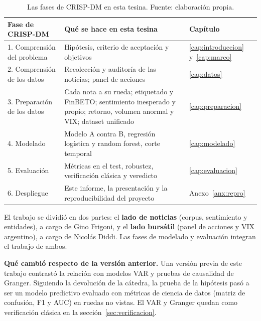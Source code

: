 \begin{table}[H]
\centering\small
\begin{tabularx}{\linewidth}{@{}L{3.6cm}YL{1.9cm}@{}}
\toprule
\textbf{Fase de CRISP-DM} & \textbf{Qué se hace en esta tesina} & \textbf{Capítulo} \\
. Comprensión del problema & Hipótesis, criterio de aceptación y objetivos & \ref{cap:introduccion} y~\ref{cap:marco} \\
2. Comprensión de los datos & Recolección y auditoría de las noticias; panel de acciones & \ref{cap:datos} \\
3. Preparación de los datos & Cada nota a su rueda; etiquetado y FinBETO; sentimiento inesperado y propio; retorno, volumen anormal y VIX; dataset unificado & \ref{cap:preparacion} \\
4. Modelado & Modelo A contra B, regresión logística y random forest, corte temporal & \ref{cap:modelado} \\
5. Evaluación & Métricas en el test, robustez, verificación clásica y veredicto & \ref{cap:evaluacion} \\
6. Despliegue & Este informe, la presentación y la reproducibilidad del proyecto & Anexo~\ref{anx:repro} \\
\bottomrule
\end{tabularx}
\caption{Las fases de CRISP-DM en esta tesina. Fuente: elaboración propia.}
\label{tab:crispdm}
\end{table}

El trabajo se dividió en dos partes: el \textbf{lado de noticias} (corpus, sentimiento y
entidades), a cargo de Gino Frigoni, y el \textbf{lado bursátil} (panel de acciones y VIX
argentino), a cargo de Nicolás Diddi. Las fases de modelado y evaluación integran el trabajo de
ambos.

\textbf{Qué cambió respecto de la versión anterior.} Una versión previa de este trabajo contrastó
la relación con modelos VAR y pruebas de causalidad de Granger. Siguiendo la devolución de la
cátedra, la prueba de la hipótesis pasó a ser un modelo predictivo evaluado con métricas de
ciencia de datos (matriz de confusión, F1 y AUC) en ruedas no vistas. El VAR y Granger quedan como
verificación clásica en la sección~\ref{sec:verificacion}.
